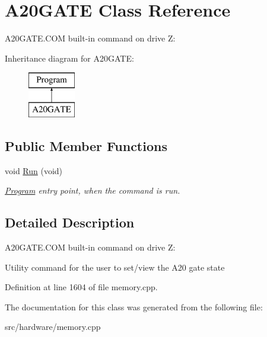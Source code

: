 \hypertarget{classA20GATE}{\section{A20\-G\-A\-T\-E Class Reference}
\label{classA20GATE}
}


A20\-G\-A\-T\-E.\-C\-O\-M built-\/in command on drive Z\-:  


Inheritance diagram for A20\-G\-A\-T\-E\-:\begin{figure}[H]
\begin{center}
\leavevmode
\includegraphics[height=2.000000cm]{classA20GATE}
\end{center}
\end{figure}
\subsection*{Public Member Functions}
\begin{DoxyCompactItemize}
\item 
\hypertarget{classA20GATE_a7d53ddb7d6453f710b7e829b5c0f6ca3}{void \hyperlink{classA20GATE_a7d53ddb7d6453f710b7e829b5c0f6ca3}{Run} (void)}\label{classA20GATE_a7d53ddb7d6453f710b7e829b5c0f6ca3}

\begin{DoxyCompactList}\small\item\em \hyperlink{classProgram}{Program} entry point, when the command is run. \end{DoxyCompactList}\end{DoxyCompactItemize}


\subsection{Detailed Description}
A20\-G\-A\-T\-E.\-C\-O\-M built-\/in command on drive Z\-: 

Utility command for the user to set/view the A20 gate state 

Definition at line 1604 of file memory.\-cpp.



The documentation for this class was generated from the following file\-:\begin{DoxyCompactItemize}
\item 
src/hardware/memory.\-cpp\end{DoxyCompactItemize}
